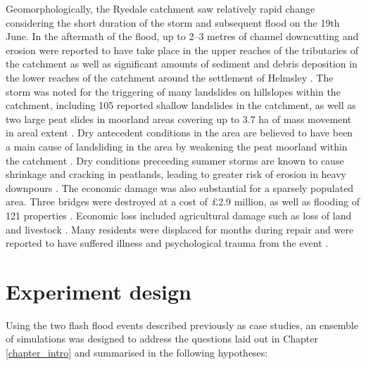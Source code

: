 Geomorphologically, the Ryedale catchment saw relatively rapid change considering the short duration of the storm and subsequent flood on the 19th June. In the aftermath of the flood, up to 2--3 metres of channel downcutting and erosion were reported to have take place in the upper reaches of the tributaries of the catchment \citep{hopkins2012knowledge,wass2008investigation} as well as significant amounts of sediment and debris deposition in the lower reaches of the catchment around the settlement of Helmsley \citep{hopkins2012knowledge}. The storm was noted for the triggering of many landslides on hillslopes within the catchment, including 105 reported shallow landslides in the catchment, as well as two large peat slides in moorland areas covering up to 3.7 ha of mass movement in areal extent \citep{galiatsatos2007assessment,wass2008investigation}. Dry antecedent conditions in the area are believed to have been a main cause of landsliding in the area by weakening the peat moorland within the catchment \citep{sibley2009analysis}. Dry conditions preceeding summer storms are known to cause shrinkage and cracking in peatlands, leading to greater risk of erosion in heavy downpours \citep{warburton2004hydrological}. 
The economic damage was also substantial for a sparsely populated area. Three bridges were destroyed at a cost of £2.9 million, as well as flooding of 121 properties \citep{wass2008investigation}. Economic loss included agricultural damage such as loss of land and livestock \citep{sibley2009analysis}. Many residents were displaced for months during repair and were reported to have suffered illness and psychological trauma from the event \citep{hopkins2012knowledge}.



\section{Experiment design}
\label{section_experiment_design}

Using the two flash flood events described previously as case studies, an ensemble of simulations was designed to address the questions laid out in Chapter \ref{chapter_intro} and summarised in the following hypotheses:

